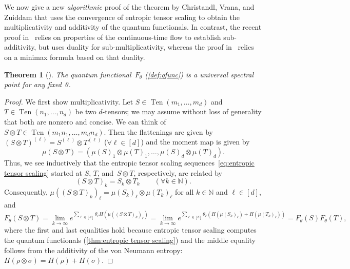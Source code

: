 \documentclass[11pt,letterpaper]{article}
\newtheorem{theorem}{Theorem}[section]
\numberwithin{equation}{section}
\newcommand{\ot}{\otimes}
\newcommand{\NN}{\mathbb{N}}
\newcommand{\qfunc}{F}
\DeclareMathOperator{\Ten}{Ten}
\begin{document}
We now give a new \emph{algorithmic} proof of the theorem by Christandl, Vrana, and Zuiddam that uses the convergence of entropic tensor scaling to obtain the multiplicativity and additivity of the quantum functionals.
In contrast, the recent proof in~\cite{Hirai2025} relies on properties of the continuous-time flow to establish sub-additivity, but uses duality for sub-multiplicativity, whereas the proof in~\cite{SDW2026} relies on a minimax formula based on that duality.

\begin{theorem}[\cite{CVZ2018}]\label{thm:algorithmicproof}
The quantum functional~$\qfunc_\theta$ (\cref{def:qfunc}) is a universal spectral point for any fixed~$\theta$.
\end{theorem}
\begin{proof}
We first show multiplicativity.
Let $S\in\Ten(m_1,\dots,m_d)$ and $T\in\Ten(n_1,\dots,n_d)$ be two $d$-tensors; we may assume without loss of generality that both are nonzero and concise.
We can think of $S \ot T \in \Ten(m_1n_1,\dots,m_dn_d)$.
Then the flattenings are given by $(S\ot T)^{(\ell)} = S^{(\ell)}\ot T^{(\ell)}$ ($\forall \ell\in [d]$) and the moment map is given by
\[
    \mu(S\ot T) = \left( \mu(S)_1 \ot \mu(T)_1 , \dots,\mu(S)_d \ot \mu(T)_d \right).
\]
Thus, we see inductively that the entropic tensor scaling sequences~\eqref{eq:entropic tensor scaling} started at $S$, $T$, and~$S \ot T$, respectively, are related by
\[
    (S\ot T)_{k}=S_k\ot T_k \qquad (\forall k \in \NN).
\]
Consequently, $\mu((S \ot T)_k)_\ell = \mu(S_k)_\ell \ot \mu(T_k)_\ell$ for all $k\in\NN$ and $\ell\in[d]$, and
\[
    \qfunc_\theta(S\ot T)
= \lim_{k\to\infty} e^{\sum_{\ell \in [d]}\theta_\ell H(\mu( (S\ot T)_k )_\ell)}
= \lim_{k\to\infty} e^{\sum_{\ell \in [d]}\theta_\ell (H(\mu( S_{k} )_\ell)+H(\mu( T_{k} )_\ell))}
= \qfunc_\theta(S)\qfunc_\theta(T),
\]
where the first and last equalities hold because entropic tensor scaling computes the quantum functionals (\cref{thm:entropic tensor scaling}) and the middle equality follows from the additivity of the von Neumann entropy: $H(\rho\otimes\sigma)=H(\rho)+H(\sigma)$.


\end{proof}
\end{document}
